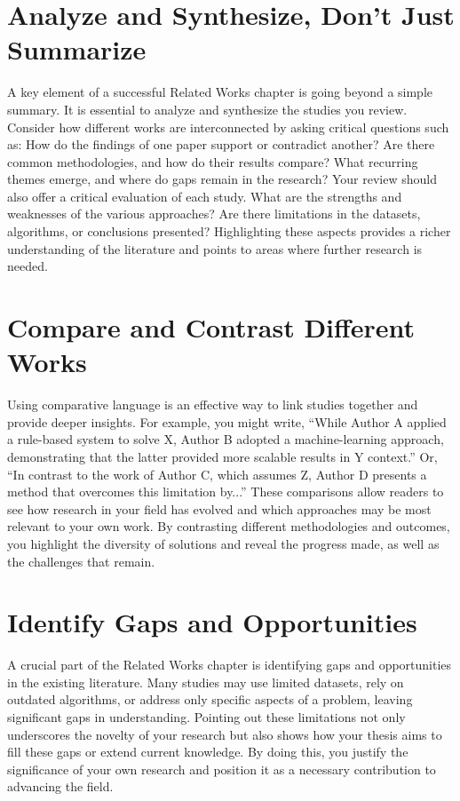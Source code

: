 \documentclass{iutbscthesis}
\begin{document}
\section{Analyze and Synthesize, Don't Just Summarize}
A key element of a successful Related Works chapter is going beyond a simple summary. It is essential to analyze and synthesize the studies you review. Consider how different works are interconnected by asking critical questions such as: How do the findings of one paper support or contradict another? Are there common methodologies, and how do their results compare? What recurring themes emerge, and where do gaps remain in the research? Your review should also offer a critical evaluation of each study. What are the strengths and weaknesses of the various approaches? Are there limitations in the datasets, algorithms, or conclusions presented? Highlighting these aspects provides a richer understanding of the literature and points to areas where further research is needed.

\section{Compare and Contrast Different Works}
Using comparative language is an effective way to link studies together and provide deeper insights. For example, you might write, ``While Author A applied a rule-based system to solve X, Author B adopted a machine-learning approach, demonstrating that the latter provided more scalable results in Y context.'' Or, ``In contrast to the work of Author C, which assumes Z, Author D presents a method that overcomes this limitation by...'' These comparisons allow readers to see how research in your field has evolved and which approaches may be most relevant to your own work. By contrasting different methodologies and outcomes, you highlight the diversity of solutions and reveal the progress made, as well as the challenges that remain.

\section{Identify Gaps and Opportunities}
A crucial part of the Related Works chapter is identifying gaps and opportunities in the existing literature. Many studies may use limited datasets, rely on outdated algorithms, or address only specific aspects of a problem, leaving significant gaps in understanding. Pointing out these limitations not only underscores the novelty of your research but also shows how your thesis aims to fill these gaps or extend current knowledge. By doing this, you justify the significance of your own research and position it as a necessary contribution to advancing the field.
\end{document}
